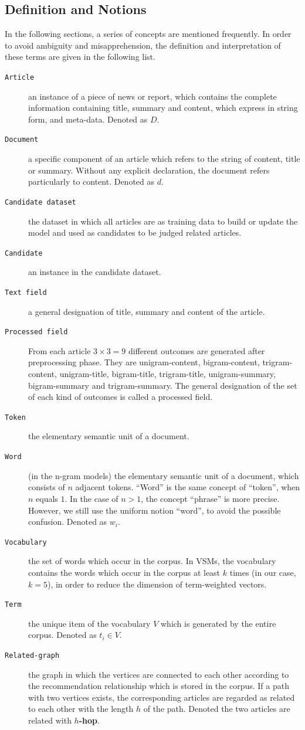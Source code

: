 \subsection{Definition and Notions}
\label{sec:4.2}

In the following sections, a series of concepts are mentioned frequently. In order to avoid ambiguity and misapprehension, the definition and interpretation of these terms are given in the following list.

\begin{description}
\item[\texttt{Article}] an instance of a piece of news or report, which contains the complete information containing title, summary and content, which express in string form, and meta-data. Denoted as $D$.
\item[\texttt{Document}] a specific component of an article which refers to the string of content, title or summary. Without any explicit declaration, the document refers particularly to content. Denoted as $d$.
\item[\texttt{Candidate dataset}] the dataset in which all articles are as training data to build or update the model and used as candidates to be judged related articles. 
\item[\texttt{Candidate}] an instance in the candidate dataset.
\item[\texttt{Text field}] a general designation of title, summary and content of the article. 
\item[\texttt{Processed field}] From each article $3\times3=9$ different outcomes are generated after preprocessing phase. They are unigram-content, bigram-content, trigram-content, unigram-title, bigram-title, trigram-title, unigram-summary, bigram-summary and trigram-summary. The general designation of the set of each kind of outcomes is called a processed field. 
\item[\texttt{Token}] the elementary semantic unit of a document.
\item[\texttt{Word}] (in the n-gram models) the elementary semantic unit of a document, which consists of $n$ adjacent tokens. ``Word'' is the same concept of ``token'', when $n$ equals $1$. In the case of $n > 1$, the concept ``phrase'' is more precise. However, we still use the uniform notion ``word'', to avoid the possible confusion. Denoted as $w_i$. 
\item[\texttt{Vocabulary}] the set of words which occur in the corpus. In VSMs, the vocabulary contains the words which occur in the corpus at least $k$ times (in our case, $k=5$), in order to reduce the dimension of term-weighted vectors. 
\item[\texttt{Term}] the unique item of the vocabulary $V$ which is generated by the entire corpus. Denoted as $t_i \in V$. 
\item[\texttt{Related-graph}] the graph in which the vertices are connected to each other according to the recommendation relationship which is stored in the corpus. If a path with two vertices exists, the corresponding articles are regarded as related to each other with the length $h$ of the path. Denoted the two articles are related with \textbf{$h$-hop}.


\end{description}
